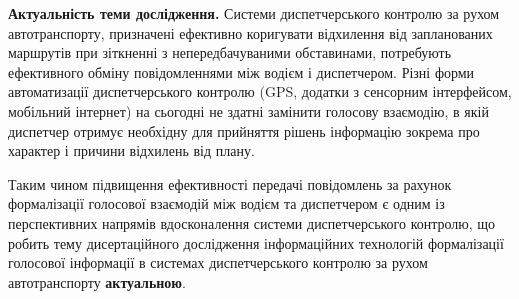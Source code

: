 \textbf{Актуальність теми дослідження.} 
Системи диспетчерського контролю за рухом автотранспорту, призначені ефективно коригувати відхилення від запланованих маршрутів при зіткненні з непередбачуваними обставинами, потребують ефективного обміну повідомленнями між водієм і диспетчером. Різні форми автоматизації диспетчерського контролю (GPS, додатки з сенсорним інтерфейсом, мобільний інтернет) на сьогодні не здатні замінити голосову взаємодію, в якій диспетчер отримує необхідну для прийняття рішень інформацію зокрема про характер і причини відхилень від плану. 

Таким чином підвищення ефективності передачі повідомлень за рахунок формалізації голосової взаємодій між водієм та диспетчером є одним із перспективних напрямів вдосконалення системи диспетчерського контролю, що робить тему дисертаційного дослідження інформаційних технологій формалізації голосової інформації в системах диспетчерського контролю за рухом автотранспорту \textbf{актуальною}.

